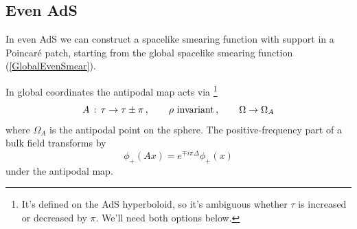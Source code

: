 \documentclass[12pt]{article}
\begin{document}
\subsection{Even AdS} \label{epads}

In even AdS we can construct a spacelike smearing function with
support in a Poincar\'e patch, starting from the global spacelike
smearing function (\ref{GlobalEvenSmear}).

In global coordinates the antipodal map acts via \footnote{It's
defined on the AdS hyperboloid, so it's ambiguous whether $\tau$ is
increased or decreased by $\pi$.  We'll need both options below.}
\[
A \, : \, \tau \rightarrow \tau \pm \pi\, , \qquad \rho ~ {\rm invariant} \, ,\qquad \Omega \rightarrow \Omega_A
\]
where $\Omega_A$ is the antipodal point on the sphere.  The positive-frequency part of a bulk field transforms by
\[
\phi_+(Ax) = e^{\mp i \pi \Delta} \phi_+(x)
\]
under the antipodal map.
\end{document}
